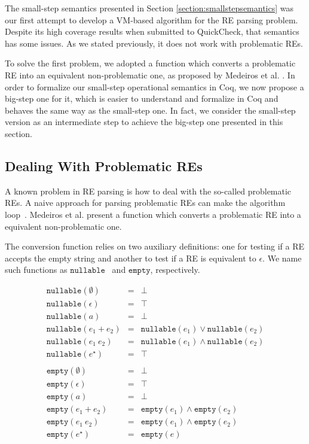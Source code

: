 \documentclass[oneside,12pt]{scrbook}
\theoremstyle{definition}
\newcommand{\nullable}{\ensuremath{\texttt{nullable}}}
\newcommand{\emptyy}{\ensuremath{\texttt{empty}}}
\theoremstyle{plain}
\theoremstyle{definition}
\begin{document}
The small-step semantics presented in Section \ref{section:smallstepsemantics} was our first attempt to develop a VM-based algorithm for the RE parsing problem. Despite its high coverage results when submitted to QuickCheck, that semantics has some issues. As we stated previously, it does not work with problematic REs.

To solve the first problem, we adopted a function which converts a problematic RE into an equivalent non-problematic one, as proposed by Medeiros et al. \cite{Medeiros14}. In order to formalize our small-step operational semantics in Coq, we now propose a big-step one for it, which is easier to understand and formalize in Coq and behaves the same way as the small-step one. In fact, we consider the small-step version as an intermediate step to achieve the big-step one presented in this section.

\subsection{Dealing With Problematic REs}\label{subsection:problematic}

A known problem in RE parsing is how to deal with the so-called problematic REs. A naive approach for 
parsing problematic REs can make the algorithm loop~\cite{Frisch2004}. Medeiros et al. \cite{Medeiros14}
present a function which converts a problematic RE into a equivalent non-problematic one.

The conversion function relies on two auxiliary definitions: one for testing if a RE accepts the empty string and 
another to test if a RE is equivalent to $\epsilon$. We name such functions as \nullable~ and \emptyy, 
respectively.

\[
\begin{array}{lcl}
\nullable(\emptyset) & = & \bot \\ 
\nullable(\epsilon)  & = & \top \\
\nullable(a)         & = & \bot \\ 
\nullable(e_1 + e_2) & = & \nullable(e_1)\lor\nullable(e_2)\\
\nullable(e_1\:e_2)  & = & \nullable(e_1)\land\nullable(e_2)\\
\nullable(e ^\star)  & = & \top \\
\\
\emptyy(\emptyset)    & = & \bot \\ 
\emptyy(\epsilon)     & = & \top \\
\emptyy(a)            & = & \bot \\
\emptyy(e_1 + e_2)    & = & \emptyy(e_1) \land \emptyy(e_2)\\
\emptyy(e_1\:e_2)     & = & \emptyy(e_1) \land \emptyy(e_2)\\
\emptyy(e ^\star)     & = & \emptyy(e)\\        
\end{array}
\]
\end{document}
